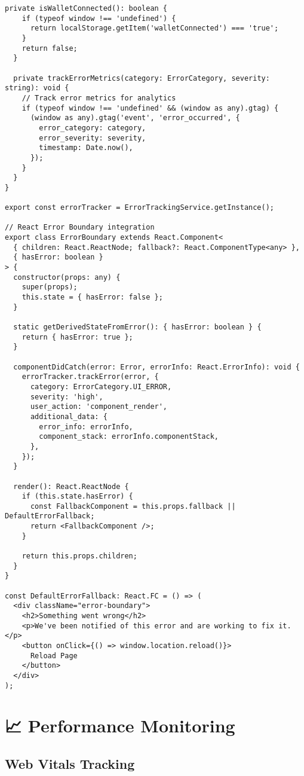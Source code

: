 \documentclass[11pt,a4paper]{article}
\begin{document}
\begin{lstlisting}[style=javascript, caption=Custom Error Tracking Service]
  private isWalletConnected(): boolean {
    if (typeof window !== 'undefined') {
      return localStorage.getItem('walletConnected') === 'true';
    }
    return false;
  }
  
  private trackErrorMetrics(category: ErrorCategory, severity: string): void {
    // Track error metrics for analytics
    if (typeof window !== 'undefined' && (window as any).gtag) {
      (window as any).gtag('event', 'error_occurred', {
        error_category: category,
        error_severity: severity,
        timestamp: Date.now(),
      });
    }
  }
}

export const errorTracker = ErrorTrackingService.getInstance();

// React Error Boundary integration
export class ErrorBoundary extends React.Component<
  { children: React.ReactNode; fallback?: React.ComponentType<any> },
  { hasError: boolean }
> {
  constructor(props: any) {
    super(props);
    this.state = { hasError: false };
  }
  
  static getDerivedStateFromError(): { hasError: boolean } {
    return { hasError: true };
  }
  
  componentDidCatch(error: Error, errorInfo: React.ErrorInfo): void {
    errorTracker.trackError(error, {
      category: ErrorCategory.UI_ERROR,
      severity: 'high',
      user_action: 'component_render',
      additional_data: {
        error_info: errorInfo,
        component_stack: errorInfo.componentStack,
      },
    });
  }
  
  render(): React.ReactNode {
    if (this.state.hasError) {
      const FallbackComponent = this.props.fallback || DefaultErrorFallback;
      return <FallbackComponent />;
    }
    
    return this.props.children;
  }
}

const DefaultErrorFallback: React.FC = () => (
  <div className="error-boundary">
    <h2>Something went wrong</h2>
    <p>We've been notified of this error and are working to fix it.</p>
    <button onClick={() => window.location.reload()}>
      Reload Page
    </button>
  </div>
);
\end{lstlisting}

\section{📈 Performance Monitoring}

\subsection{Web Vitals Tracking}
\end{document}
